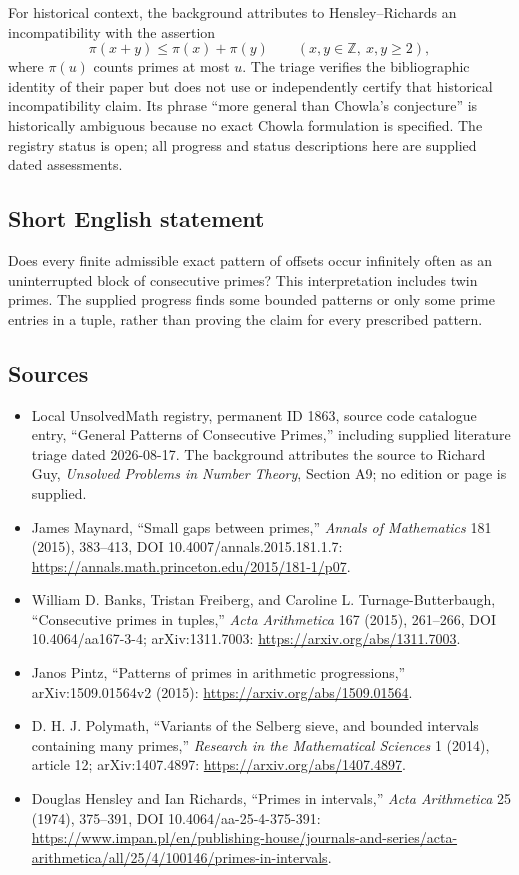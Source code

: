 \documentclass[11pt]{article}
\newcommand{\Z}{\mathbb{Z}}
\begin{document}
For historical context, the background attributes to Hensley--Richards an incompatibility with the assertion
\[
\pi(x+y)\leq\pi(x)+\pi(y)\qquad(x,y\in\Z,\ x,y\geq2),
\]
where \(\pi(u)\) counts primes at most \(u\). The triage verifies the bibliographic identity of their paper but does not use or independently certify that historical incompatibility claim. Its phrase ``more general than Chowla's conjecture'' is historically ambiguous because no exact Chowla formulation is specified. The registry status is open; all progress and status descriptions here are supplied dated assessments.
\subsection{Short English statement}
Does every finite admissible exact pattern of offsets occur infinitely often as an uninterrupted block of consecutive primes? This interpretation includes twin primes. The supplied progress finds some bounded patterns or only some prime entries in a tuple, rather than proving the claim for every prescribed pattern.
\subsection{Sources}
\begin{itemize}
\item Local UnsolvedMath registry, permanent ID 1863, source code catalogue entry, ``General Patterns of Consecutive Primes,'' including supplied literature triage dated 2026-08-17. The background attributes the source to Richard Guy, \emph{Unsolved Problems in Number Theory}, Section A9; no edition or page is supplied.
\item James Maynard, ``Small gaps between primes,'' \emph{Annals of Mathematics} 181 (2015), 383--413, DOI 10.4007/annals.2015.181.1.7: \url{https://annals.math.princeton.edu/2015/181-1/p07}.
\item William D. Banks, Tristan Freiberg, and Caroline L. Turnage-Butterbaugh, ``Consecutive primes in tuples,'' \emph{Acta Arithmetica} 167 (2015), 261--266, DOI 10.4064/aa167-3-4; arXiv:1311.7003: \url{https://arxiv.org/abs/1311.7003}.
\item Janos Pintz, ``Patterns of primes in arithmetic progressions,'' arXiv:1509.01564v2 (2015): \url{https://arxiv.org/abs/1509.01564}.
\item D. H. J. Polymath, ``Variants of the Selberg sieve, and bounded intervals containing many primes,'' \emph{Research in the Mathematical Sciences} 1 (2014), article 12; arXiv:1407.4897: \url{https://arxiv.org/abs/1407.4897}.
\item Douglas Hensley and Ian Richards, ``Primes in intervals,'' \emph{Acta Arithmetica} 25 (1974), 375--391, DOI 10.4064/aa-25-4-375-391: \url{https://www.impan.pl/en/publishing-house/journals-and-series/acta-arithmetica/all/25/4/100146/primes-in-intervals}.
\end{itemize}
\end{document}
